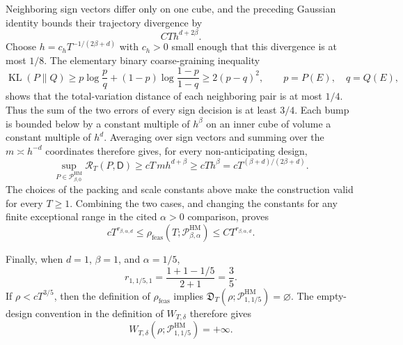 Neighboring sign vectors differ only on one cube, and the preceding Gaussian identity bounds their trajectory divergence by
\[
 CT h^{d+2\beta}.
\]
Choose \(h=c_hT^{-1/(2\beta+d)}\) with \(c_h>0\) small enough that this divergence is at most \(1/8\).  The elementary binary coarse-graining inequality
\[
 \operatorname{KL}(P\|Q)
 \geq p\log\frac pq+(1-p)\log\frac{1-p}{1-q}
 \geq2(p-q)^2,
 \qquad p=P(E),\quad q=Q(E),
\]
shows that the total-variation distance of each neighboring pair is at most \(1/4\).  Thus the sum of the two errors of every sign decision is at least \(3/4\).  Each bump is bounded below by a constant multiple of \(h^\beta\) on an inner cube of volume a constant multiple of \(h^d\).  Averaging over sign vectors and summing over the \(m\asymp h^{-d}\) coordinates therefore gives, for every non-anticipating design,
\[
 \sup_{P\in\mathcal P_{\beta,0}^{\mathrm{HM}}}
 \mathcal R_T(P,\mathsf D)
 \geq cT\,m h^{d+\beta}
 \geq cTh^\beta
 =cT^{(\beta+d)/(2\beta+d)}.
\]
The choices of the packing and scale constants above make the construction valid for every \(T\geq1\).  Combining the two cases, and changing the constants for any finite exceptional range in the cited \(\alpha>0\) comparison, proves
\[
 cT^{r_{\beta,\alpha,d}}
 \leq\rho_{\mathrm{feas}}(T;\mathcal P_{\beta,\alpha}^{\mathrm{HM}})
 \leq CT^{r_{\beta,\alpha,d}}.
\]

Finally, when \(d=1\), \(\beta=1\), and \(\alpha=1/5\),
\[
 r_{1,1/5,1}
 =\frac{1+1-1/5}{2+1}=\frac35.
\]
If \(\rho<cT^{3/5}\), then the definition of \(\rho_{\mathrm{feas}}\) implies \(\mathfrak D_T(\rho;\mathcal P_{1,1/5}^{\mathrm{HM}})=\varnothing\).  The empty-design convention in the definition of \(W_{T,\delta}\) therefore gives
\[
 W_{T,\delta}(\rho;\mathcal P_{1,1/5}^{\mathrm{HM}})=+\infty.
\]
